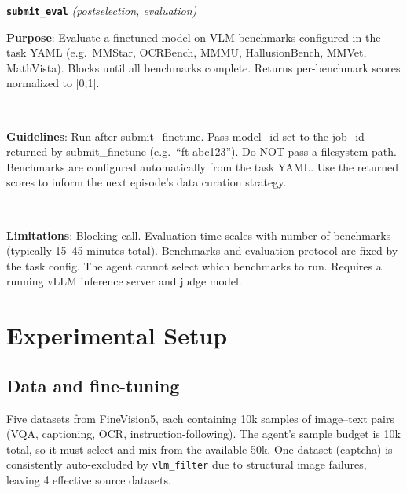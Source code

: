 \medskip
\noindent\textbf{\texttt{submit\_eval}} \textit{(postselection, evaluation)}
\begin{tcolorbox}[enhanced, colback=white, colframe=black!60, boxrule=0.6pt, left=6pt, right=6pt, top=0pt, bottom=0pt, sharp corners, boxsep=0pt]
\colorbox{purposebg}{\parbox{\dimexpr\linewidth-2\fboxsep}{%
\ttfamily\scriptsize\vspace{4pt}
\textbf{Purpose}: Evaluate a finetuned model on VLM benchmarks configured in the task YAML (e.g.\ MMStar, OCRBench, MMMU, HallusionBench, MMVet, MathVista). Blocks until all benchmarks complete. Returns per-benchmark scores normalized to [0,1].\vspace{4pt}
}}\\[-1pt]
\colorbox{guidelinesbg}{\parbox{\dimexpr\linewidth-2\fboxsep}{%
\ttfamily\scriptsize\vspace{4pt}
\textbf{Guidelines}: Run after submit\_finetune. Pass model\_id set to the job\_id returned by submit\_finetune (e.g.\ ``ft-abc123''). Do NOT pass a filesystem path. Benchmarks are configured automatically from the task YAML. Use the returned scores to inform the next episode's data curation strategy.\vspace{4pt}
}}\\[-1pt]
\colorbox{limitationsbg}{\parbox{\dimexpr\linewidth-2\fboxsep}{%
\ttfamily\scriptsize\vspace{4pt}
\textbf{Limitations}: Blocking call. Evaluation time scales with number of benchmarks (typically 15--45 minutes total). Benchmarks and evaluation protocol are fixed by the task config. The agent cannot select which benchmarks to run. Requires a running vLLM inference server and judge model.\vspace{4pt}
}}
\end{tcolorbox}



\newpage
\section{Experimental Setup}
\label{sec:setup}

\subsection{Data and fine-tuning}

Five datasets from FineVision5, each containing 10k samples of image--text pairs (VQA, captioning, OCR, instruction-following). The agent's sample budget is 10k total, so it must select and mix from the available 50k. One dataset (captcha) is consistently auto-excluded by \texttt{vlm\_filter} due to structural image failures, leaving 4 effective source datasets.

